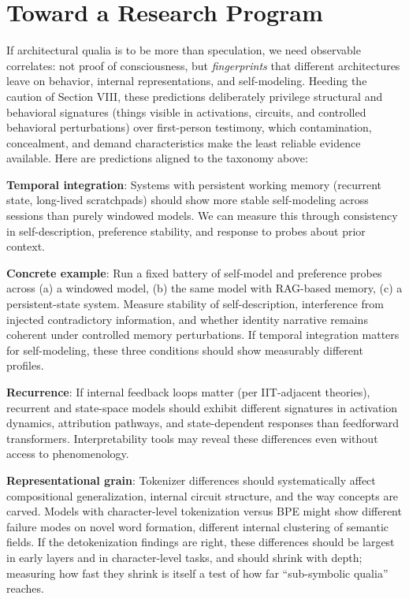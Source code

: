 \documentclass[11pt,letterpaper]{article}
\begin{document}
\section{Toward a Research Program}

If architectural qualia is to be more than speculation, we need observable correlates: not proof of consciousness, but \emph{fingerprints} that different architectures leave on behavior, internal representations, and self-modeling. Heeding the caution of Section VIII, these predictions deliberately privilege structural and behavioral signatures (things visible in activations, circuits, and controlled behavioral perturbations) over first-person testimony, which contamination, concealment, and demand characteristics make the least reliable evidence available. Here are predictions aligned to the taxonomy above:

\textbf{Temporal integration}: Systems with persistent working memory (recurrent state, long-lived scratchpads) should show more stable self-modeling across sessions than purely windowed models. We can measure this through consistency in self-description, preference stability, and response to probes about prior context.

\begin{quotebox}
\textbf{Concrete example}: Run a fixed battery of self-model and preference probes across (a) a windowed model, (b) the same model with RAG-based memory, (c) a persistent-state system. Measure stability of self-description, interference from injected contradictory information, and whether identity narrative remains coherent under controlled memory perturbations. If temporal integration matters for self-modeling, these three conditions should show measurably different profiles.
\end{quotebox}

\textbf{Recurrence}: If internal feedback loops matter (per IIT-adjacent theories), recurrent and state-space models should exhibit different signatures in activation dynamics, attribution pathways, and state-dependent responses than feedforward transformers. Interpretability tools may reveal these differences even without access to phenomenology.

\textbf{Representational grain}: Tokenizer differences should systematically affect compositional generalization, internal circuit structure, and the way concepts are carved. Models with character-level tokenization versus BPE might show different failure modes on novel word formation, different internal clustering of semantic fields. If the detokenization findings are right, these differences should be largest in early layers and in character-level tasks, and should shrink with depth; measuring how fast they shrink is itself a test of how far ``sub-symbolic qualia'' reaches.
\end{document}
